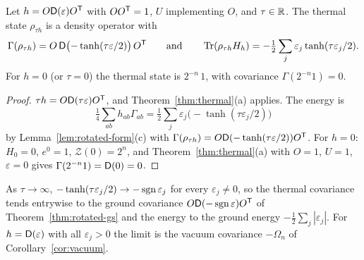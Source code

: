 \begin{corollary}\label{cor:beta}
Let $h=O\mathsf D(\varepsilon)O^{\mathsf T}$ with $OO^{\mathsf T}=1$, $U$ implementing $O$, and $\tau\in\mathbb R$.
The thermal state $\rho_{\tau h}$ is a density operator with
\[
 \Gamma(\rho_{\tau h})=O\,\mathsf D\bigl(-\tanh(\tau\varepsilon/2)\bigr)\,O^{\mathsf T}
 \qquad\text{and}\qquad
 \operatorname{Tr}(\rho_{\tau h}H_h)=-\tfrac12\sum_j\varepsilon_j\tanh(\tau\varepsilon_j/2).
\]
For $h=0$ (or $\tau=0$) the thermal state is $2^{-n}\,1$, with covariance $\Gamma(2^{-n}1)=0$.
\end{corollary}
\begin{proof}
$\tau h=O\mathsf D(\tau\varepsilon)O^{\mathsf T}$, and Theorem~\ref{thm:thermal}(a) applies. The energy is
\[
 \tfrac14\sum_{ab}h_{ab}\Gamma_{ab}=\tfrac12\sum_j\varepsilon_j\bigl(-\tanh(\tau\varepsilon_j/2)\bigr)
\]
by Lemma~\ref{lem:rotated-form}(c) with $\Gamma(\rho_{\tau h})=O\mathsf D(-\tanh(\tau\varepsilon/2))O^{\mathsf T}$. For $h=0$: $H_0=0$, $e^0=1$, $\mathcal Z(0)=2^n$, and
Theorem~\ref{thm:thermal}(a) with $O=1$, $U=1$, $\varepsilon=0$ gives $\Gamma(2^{-n}1)=\mathsf D(0)=0$.
\end{proof}
\begin{remark}\label{rem:zero-temperature}
As $\tau\to\infty$, $-\tanh(\tau\varepsilon_j/2)\to-\operatorname{sgn}\varepsilon_j$ for every
$\varepsilon_j\neq0$, so  the thermal covariance tends entrywise to the ground covariance
$O\mathsf D(-\operatorname{sgn}\varepsilon)O^{\mathsf T}$ of Theorem~\ref{thm:rotated-gs} and the energy to the ground
energy $-\tfrac12\sum_j|\varepsilon_j|$. For $h=\mathsf D(\varepsilon)$ with all $\varepsilon_j>0$ the
limit is the vacuum covariance $-\Omega_n$ of Corollary~\ref{cor:vacuum}.
\end{remark}

